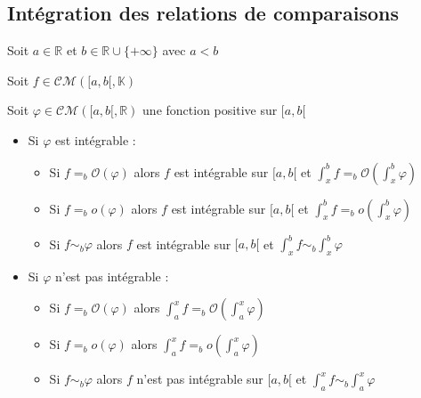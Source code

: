 \documentclass[a4paper,12pt]{book}
\newcommand{\Thr}[2]{\begin{tcolorbox}[sharp corners, colback=white,colframe=red!90!black!75, title=Théorème : #1]#2\end{tcolorbox}}
\def\R{\mathbb{R}}
\def\K{\mathbb{K}}
\begin{document}
\subsection{Intégration des relations de comparaisons}
\Thr{Intégration des ordres de grandeur}{Soit $a\in\R$ et $b\in\R\cup\{+\infty\}$ avec $a<b$ \par Soit $f\in\mathcal{CM}([a,b[,\K)$ \par Soit $\varphi\in\mathcal{CM}([a,b[,\R)$ une fonction positive sur $[a,b[$\begin{itemize}
\item Si $\varphi$ est intégrable :\begin{itemize}
    \item Si $f=_b\mathcal{O}(\varphi)$ alors $f$ est intégrable sur $[a,b[$ et $\int_x^bf=_b\mathcal{O}(\int_x^b\varphi)$
    \item Si $f=_bo(\varphi)$ alors $f$ est intégrable sur $[a,b[$ et $\int_x^bf=_bo(\int_x^b\varphi)$
    \item Si $f\sim_b\varphi$ alors $f$ est intégrable sur $[a,b[$ et $\int_x^bf\sim_b\int_x^b\varphi$
\end{itemize}
\item Si $\varphi$ n'est pas intégrable :\begin{itemize}
    \item Si $f=_b\mathcal{O}(\varphi)$ alors $\int_a^xf=_b\mathcal{O}(\int_a^x\varphi)$
    \item Si $f=_bo(\varphi)$ alors $\int_a^xf=_bo(\int_a^x\varphi)$
    \item Si $f\sim_b\varphi$ alors $f$ n'est pas intégrable sur $[a,b[$ et $\int_a^xf\sim_b\int_a^x\varphi$
\end{itemize}
\end{itemize}}
\end{document}
